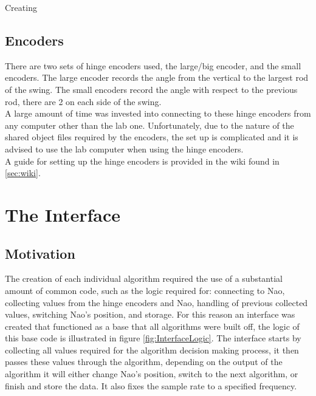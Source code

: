 \documentclass[11pt]{article}
\newcommand*\ruleline[1]{\par\noindent\raisebox{.8ex}{\makebox[\linewidth]{\hrulefill\hspace{1ex}\raisebox{-.8ex}{#1}\hspace{1ex}\hrulefill}}}
\begin{document}
Creating 

\subsection{Encoders}
\ruleline{George Sheppard}
There are two sets of hinge encoders used, the large/big encoder, and the small encoders. The large encoder records the angle from the vertical to the largest rod of the swing. The small encoders record the angle with respect to the previous rod, there are 2 on each side of the swing.\\

A large amount of time was invested into connecting to these hinge encoders from any computer other than the lab one. Unfortunately, due to the nature of the shared object files required by the encoders, the set up is complicated and it is advised to use the lab computer when using the hinge encoders.\\

A guide for setting up the hinge encoders is provided in the wiki found in \ref{sec:wiki}.

\section{The Interface}\label{sec:Interface}
\subsection{Motivation}
The creation of each individual algorithm required the use of a substantial amount of common code, such as the logic required for: connecting to Nao, collecting values from the hinge encoders and Nao, handling of previous collected values, switching Nao's position, and storage. For this reason an interface was created that functioned as a base that all algorithms were built off, the logic of this base code is illustrated in figure \ref{fig:InterfaceLogic}. The interface starts by collecting all values required for the algorithm decision making process, it then passes these values through the algorithm, depending on the output of the algorithm it will either change Nao's position, switch to the next algorithm, or finish and store the data. It also fixes the sample rate to a specified frequency.\\
\end{document}
